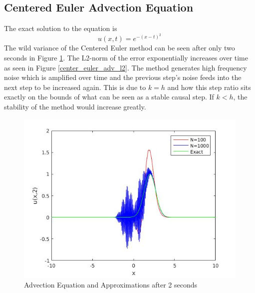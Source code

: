 \subsection{Centered Euler Advection Equation}
The exact solution to the equation is
\begin{equation}
u(x,t) = e^{-(x-t)^2}
\end{equation}
The wild variance of the Centered Euler method can be seen after only two seconds in Figure \ref{center_euler_adv}. The L2-norm of the error exponentially increases over time as seen in Figure \ref{center_euler_adv_l2}. The method generates high frequency noise which is amplified over time and the previous step's noise feeds into the next step to be increased again. This is due to $k=h$ and how this step ratio sits exactly on the bounds of what can be seen as a stable causal step. If $k<h$, the stability of the method would increase greatly.
\begin{figure}[H]
 \centering
 \includegraphics[scale=0.5]{Images/center_euler_adv.jpg}
 \caption{Advection Equation and Approximations after 2 seconds}
 \label{center_euler_adv}
\end{figure}
